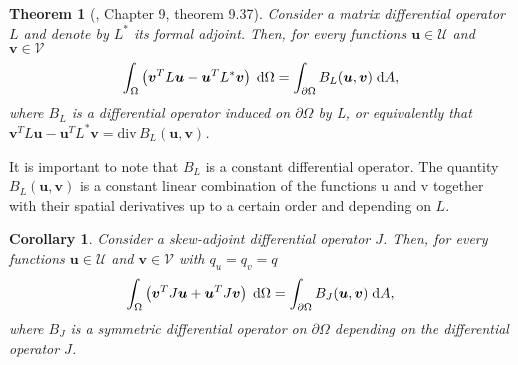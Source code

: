 \documentclass[preprint,12pt]{elsarticle}
\newtheorem{theorem}{Theorem}
\newtheorem{corollary}{Corollary}
\begin{document}
{\begin{theorem}[\cite{PDE}, Chapter 9, theorem 9.37]
Consider a matrix differential operator $L$ and denote by $L^*$ its formal adjoint. Then, for every
functions $\bm{u} \in \mathcal{U}$ and $\bm{v} \in \mathcal{V}$
\begin{equation}
\int_{\Omega} \left( \bm{v}^T L \bm{u} - \bm{u}^T L^* \bm{v}\right) \d\Omega= \int_{\partial \Omega} B_L(\bm{u}, \bm{v}) \d{A},
\end{equation}
where $B_L$ is a differential operator induced on $\partial\Omega$ by L, or equivalently that $\bm{v}^T L \bm{u} - \bm{u}^T L^* \bm{v} = \mathrm{div} \, B_L(\bm{u}, \bm{v})$.
\end{theorem}
It is important to note that $B_L$ is a constant differential operator. The quantity $B_L(\bm{u}, \bm{v})$ is a constant linear combination of the functions u and v together with their spatial derivatives up to a certain order and depending on $L$.
\begin{corollary}
Consider a skew-adjoint differential operator $J$. Then, for every
functions $\bm{u} \in \mathcal{U}$ and $\bm{v} \in \mathcal{V}$ with $q_u = q_v = q$
\begin{equation}
\int_{\Omega} \left( \bm{v}^T J \bm{u} + \bm{u}^T J \bm{v}\right) \d\Omega= \int_{\partial \Omega} B_J(\bm{u}, \bm{v}) \d{A},
\end{equation}
where $B_J$ is a symmetric differential operator on $\partial\Omega$ depending on the differential operator $J$.
\end{corollary}
}
\end{document}
